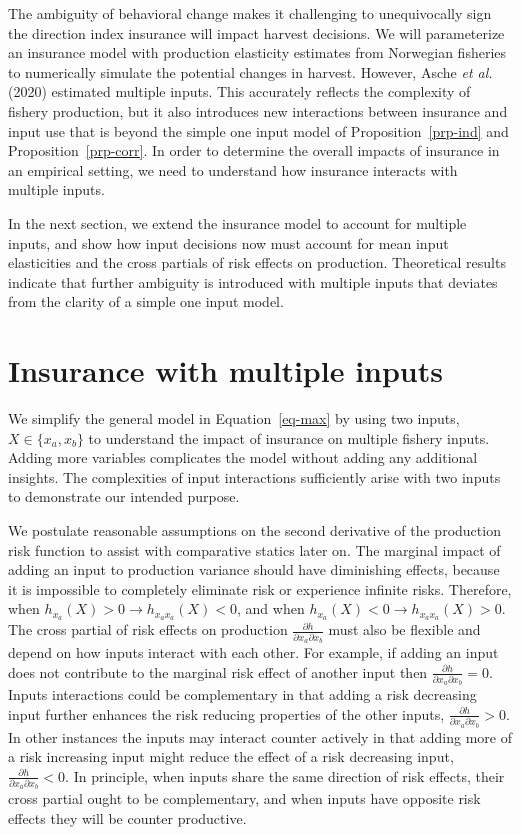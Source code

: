 \documentclass[
  letterpaper,
  DIV=11,
  numbers=noendperiod]{scrartcl}
\theoremstyle{plain}
\theoremstyle{plain}
\theoremstyle{remark}
\begin{document}
The ambiguity of behavioral change makes it challenging to unequivocally
sign the direction index insurance will impact harvest decisions. We
will parameterize an insurance model with production elasticity
estimates from Norwegian fisheries to numerically simulate the potential
changes in harvest. However, Asche \emph{et al.} (2020) estimated
multiple inputs. This accurately reflects the complexity of fishery
production, but it also introduces new interactions between insurance
and input use that is beyond the simple one input model of
Proposition~\ref{prp-ind} and Proposition~\ref{prp-corr}. In order to
determine the overall impacts of insurance in an empirical setting, we
need to understand how insurance interacts with multiple inputs.

In the next section, we extend the insurance model to account for
multiple inputs, and show how input decisions now must account for mean
input elasticities and the cross partials of risk effects on production.
Theoretical results indicate that further ambiguity is introduced with
multiple inputs that deviates from the clarity of a simple one input
model.

\hypertarget{sec-multi}{%
\section{Insurance with multiple inputs}\label{sec-multi}}

We simplify the general model in Equation~\ref{eq-max} by using two
inputs, \(X\in\{{x_a,x_b}\}\) to understand the impact of insurance on
multiple fishery inputs. Adding more variables complicates the model
without adding any additional insights. The complexities of input
interactions sufficiently arise with two inputs to demonstrate our
intended purpose.

We postulate reasonable assumptions on the second derivative of the
production risk function to assist with comparative statics later on.
The marginal impact of adding an input to production variance should
have diminishing effects, because it is impossible to completely
eliminate risk or experience infinite risks. Therefore, when
\(h_{x_a}(X)>0 \rightarrow h_{x_ax_a}(X)<0\), and when
\(h_{x_a}(X)<0 \rightarrow h_{x_ax_a}(X)>0\). The cross partial of risk
effects on production \(\frac{\partial h}{\partial x_a \partial x_b}\)
must also be flexible and depend on how inputs interact with each other.
For example, if adding an input does not contribute to the marginal risk
effect of another input then
\(\frac{\partial h}{\partial x_a \partial x_b}=0\). Inputs interactions
could be complementary in that adding a risk decreasing input further
enhances the risk reducing properties of the other inputs,
\(\frac{\partial h}{\partial x_a \partial x_b}>0\). In other instances
the inputs may interact counter actively in that adding more of a risk
increasing input might reduce the effect of a risk decreasing input,
\(\frac{\partial h}{\partial x_a \partial x_b}<0\). In principle, when
inputs share the same direction of risk effects, their cross partial
ought to be complementary, and when inputs have opposite risk effects
they will be counter productive.
\end{document}
